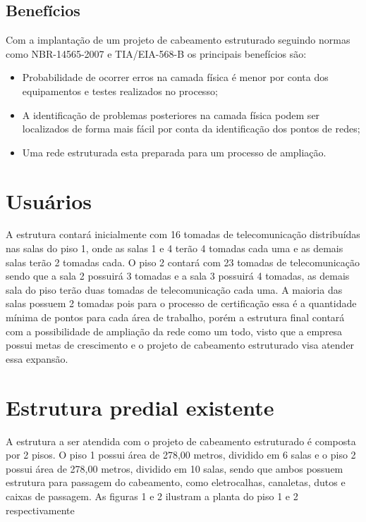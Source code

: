 \documentclass[	DIV=calc,%
							paper=a4,%
							fontsize=12pt,%
							onecolumn]{scrartcl}	 					%
\begin{document}
\subsection{Benefícios}
Com a implantação de um projeto de cabeamento estruturado seguindo normas como NBR-14565-2007 e TIA/EIA-568-B os principais benefícios são:
\begin{itemize}
\item Probabilidade de ocorrer erros na camada física é menor por conta dos equipamentos e testes realizados no processo;
\item A identificação de problemas posteriores na camada física podem ser localizados de forma mais fácil por conta da identificação dos pontos de redes;
\item Uma rede estruturada esta preparada para um processo de ampliação. 
\end{itemize}

\section{Usuários}
A estrutura contará inicialmente com 16 tomadas de telecomunicação distribuídas nas salas do piso 1, onde as salas 1 e 4 terão 4 tomadas cada uma e as demais salas terão 2 tomadas cada.
O piso 2 contará com 23 tomadas de telecomunicação sendo que a sala 2 possuirá 3 tomadas e a sala 3 possuirá 4 tomadas, as demais sala do piso terão duas tomadas de telecomunicação cada uma.
A maioria das salas possuem 2 tomadas pois para o processo de certificação essa é a quantidade mínima de pontos para cada área de trabalho, porém a estrutura final contará com a possibilidade de ampliação da rede como um todo, visto que a empresa possui metas de crescimento e o projeto de cabeamento estruturado visa atender essa expansão.


\section{Estrutura predial existente}
A estrutura a ser atendida com o projeto de cabeamento estruturado é composta por 2 pisos. O piso 1 possui área de 278,00 metros, dividido em 6 salas e o piso 2 possui área de 278,00 metros, dividido em 10 salas, sendo que ambos possuem estrutura para passagem do cabeamento, como eletrocalhas, canaletas, dutos e caixas de passagem. As figuras 1 e 2 ilustram a planta do piso 1 e 2 respectivamente    
\end{document}
